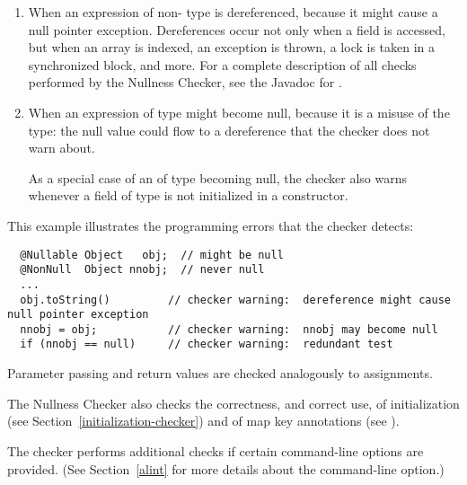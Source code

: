\begin{enumerate}

\item
  When an expression of non- type
  is dereferenced, because it might cause a null pointer exception.
  Dereferences occur not only when a field is accessed, but when an array
  is indexed, an exception is thrown, a lock is taken in a synchronized
  block, and more.  For a complete description of all checks performed by
  the Nullness Checker, see the Javadoc for
  .

\item
  When an expression of  type
  might become null, because it
  is a misuse of the type:  the null value could flow to a dereference that
  the checker does not warn about.

  As a special case of an of 
  type becoming null, the checker also warns whenever a field of
   type is not initialized in a
  constructor.

\end{enumerate}

This example illustrates the programming errors that the checker detects:

\begin{Verbatim}
  @Nullable Object   obj;  // might be null
  @NonNull  Object nnobj;  // never null
  ...
  obj.toString()         // checker warning:  dereference might cause null pointer exception
  nnobj = obj;           // checker warning:  nnobj may become null
  if (nnobj == null)     // checker warning:  redundant test
\end{Verbatim}

Parameter passing and return values are checked analogously to assignments.

The Nullness Checker also checks the correctness, and correct use, of
initialization (see
Section~\ref{initialization-checker}) and of map key annotations (see
).


The checker performs additional checks if certain 
command-line options are provided.  (See
Section~\ref{alint} for more details about the 
command-line option.)



